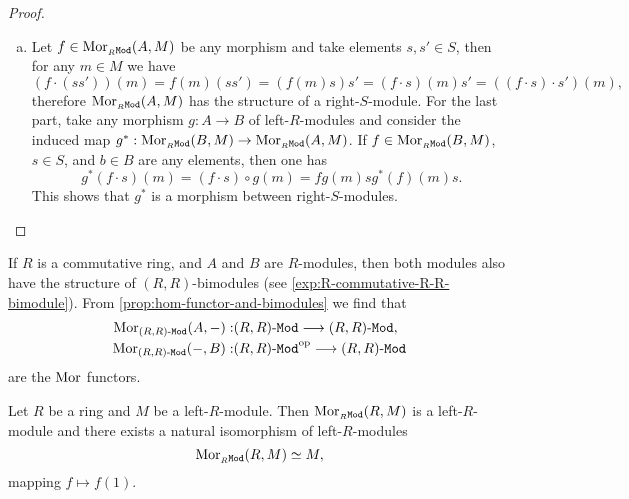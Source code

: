 \begin{proof}
\begin{enumerate}[(a)]
\item Let \(f \in \operatorname{Mor}_{{{}_{R}\texttt{Mod}}}(A, M)\) be any morphism and take elements \(s,
  s' \in S\), then for any \(m \in M\) we have
  \[
  (f \cdot (s s'))(m) = f(m)(s s') = (f(m) s) s'
  = (f \cdot s)(m) s'
  = ((f \cdot s) \cdot s')(m),
  \]
  therefore \(\operatorname{Mor}_{{{}_{R}\texttt{Mod}}}(A, M)\) has the structure of a
  right-\(S\)-module. For the last part, take any morphism \(g: A \to B\) of
  left-\(R\)-modules and consider the induced map \(g^{*}: \operatorname{Mor}_{{{}_{R}\texttt{Mod}}}(B, M)
  \to \operatorname{Mor}_{{{}_{R}\texttt{Mod}}}(A, M)\). If \(f \in \operatorname{Mor}_{{{}_{R}\texttt{Mod}}}(B, M)\), \(s \in S\),
  and \(b \in B\) are any elements, then one has
  \[
  g^{*}(f \cdot s)(m) = (f \cdot s) \circ g(m)
  = f g(m) s
  g^{*}(f)(m) s.
  \]
  This shows that \(g^{*}\) is a morphism between right-\(S\)-modules.
\end{enumerate}
\end{proof}

\begin{example}
\label{exp:R-commutative-hom-functors}
If \(R\) is a commutative ring, and \(A\) and \(B\) are \(R\)-modules, then both
modules also have the structure of \((R, R)\)-bimodules (see
\cref{exp:R-commutative-R-R-bimodule}). From
\cref{prop:hom-functor-and-bimodules} we find that
\begin{align*}
\operatorname{Mor}_{{(R, R)\text{-}\texttt{Mod}}}(A, -):& {(R, R)\text{-}\texttt{Mod}} \longrightarrow {(R, R)\text{-}\texttt{Mod}}, \\
\operatorname{Mor}_{{(R, R)\text{-}\texttt{Mod}}}(-, B):& {(R, R)\text{-}\texttt{Mod}}^{\mathrm{op}} \longrightarrow {(R, R)\text{-}\texttt{Mod}}
\end{align*}
are the \(\operatorname{Mor}\) functors.
\end{example}

\begin{corollary}
\label{cor:Mor(R-M)-iso-M}
Let \(R\) be a ring and \(M\) be a left-\(R\)-module. Then
\(\operatorname{Mor}_{{{}_{R}\texttt{Mod}}}(R, M)\) is a left-\(R\)-module and there exists a natural
isomorphism of left-\(R\)-modules
\[
\operatorname{Mor}_{{{}_{R}\texttt{Mod}}}(R, M) \simeq M,
\]
mapping \(f \mapsto f(1)\).
\end{corollary}

